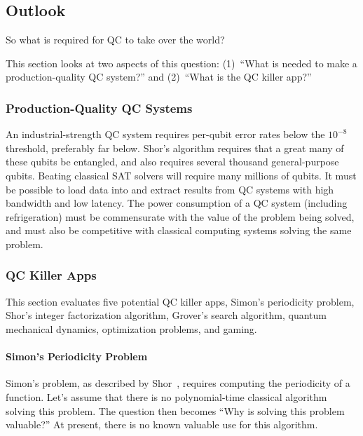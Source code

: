 \subsection{Outlook}
\label{sec:future:Outlook}

So what is required for QC to take over the world?

This section looks at two aspects of this question:
(1)~``What is needed to make a production-quality QC system?'' and
(2)~``What is the QC killer app?''

\subsubsection{Production-Quality QC Systems}
\label{sec:future:Production-Quality QC Systems}

An industrial-strength QC system requires per-qubit error rates below the
$10^{-8}$ threshold, preferably far below.
Shor's algorithm requires that a great many of these qubits be entangled,
and also requires several thousand general-purpose qubits.
Beating classical SAT solvers will require many millions of qubits.
It must be possible to load data into and extract results from QC
systems with high bandwidth and low latency.
The power consumption of a QC system (including refrigeration) must be
commensurate with the value of the problem being solved, and must also
be competitive with classical computing systems solving the same problem.

\subsubsection{QC Killer Apps}
\label{sec:future:QC Killer Apps}

This section evaluates five potential QC killer apps,
Simon's periodicity problem,
Shor's integer factorization algorithm,
Grover's search algorithm,
quantum mechanical dynamics,
optimization problems, and
gaming.

\paragraph{Simon's Periodicity Problem}
\label{sec:future:Simon's Periodicity Problem}

Simon's problem, as described by
Shor~\cite{PeterWSchor2001QuantumAlgorithms},
requires computing the periodicity of a function.
Let's assume that there is no polynomial-time classical
algorithm solving this problem.
The question then becomes ``Why is solving this problem valuable?''
At present, there is no known valuable use for this algorithm.

